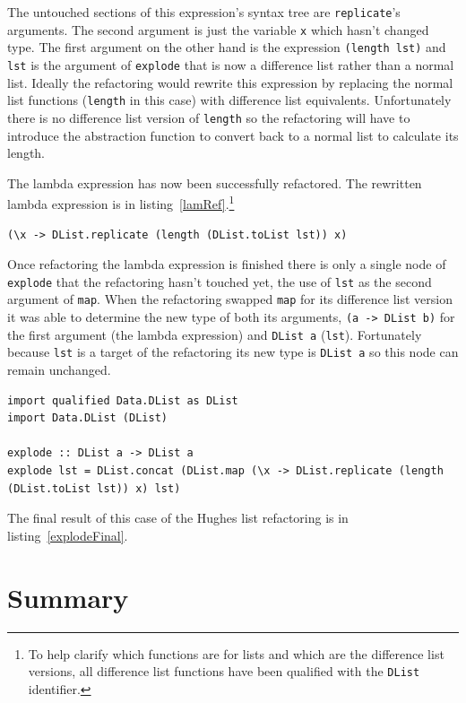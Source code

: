 The untouched sections of this expression's syntax tree are \texttt{replicate}'s arguments. The second argument is just the variable \texttt{x} which hasn't changed type. The first argument on the other hand is the expression \texttt{(length lst)} and \texttt{lst} is the argument of \texttt{explode} that is now a difference list rather than a normal list. Ideally the refactoring would rewrite this expression by replacing the normal list functions (\texttt{length} in this case) with difference list equivalents. Unfortunately there is no difference list version of \texttt{length} so the refactoring will have to introduce the abstraction function to convert back to a normal list to calculate its length. 

The lambda expression has now been successfully refactored. The rewritten lambda expression is in listing~\ref{lamRef}.\footnote{To help clarify which functions are for lists and which are the difference list versions, all difference list functions have been qualified with the \texttt{DList} identifier.}

\begin{lstlisting}[caption={The refactored lambda expression.},label=lamRef]
(\x -> DList.replicate (length (DList.toList lst)) x)
\end{lstlisting}

Once refactoring the lambda expression is finished there is only a single node of \texttt{explode} that the refactoring hasn't touched yet, the use of \texttt{lst} as the second argument of \texttt{map}. When the refactoring swapped \texttt{map} for its difference list version it was able to determine the new type of both its arguments, \texttt{(a -> DList b)} for the first argument (the lambda expression) and \texttt{DList a} (\texttt{lst}). Fortunately because \texttt{lst} is a target of the refactoring its new type is \texttt{DList a} so this node can remain unchanged.


\begin{lstlisting}[caption={The final refactored result of \texttt{explode}.},label=explodeFinal]
import qualified Data.DList as DList
import Data.DList (DList)

explode :: DList a -> DList a
explode lst = DList.concat (DList.map (\x -> DList.replicate (length (DList.toList lst)) x) lst)
\end{lstlisting} 

The final result of this case of the Hughes list refactoring is in listing~\ref{explodeFinal}.

\section{Summary}


